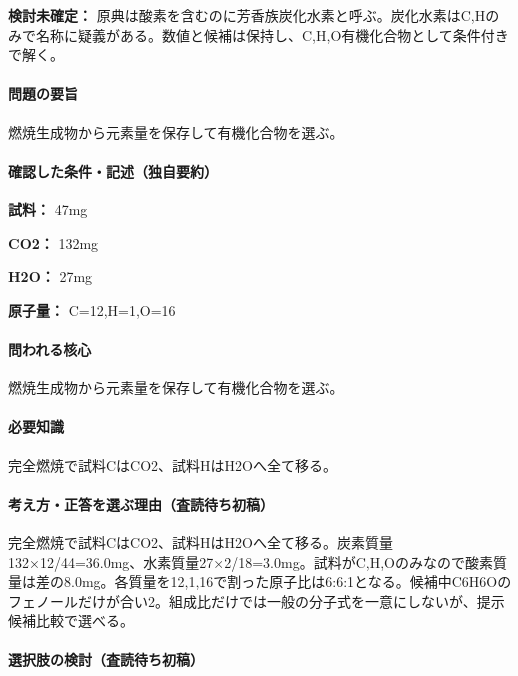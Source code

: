 \par\textbf{検討未確定：} 原典は酸素を含むのに芳香族炭化水素と呼ぶ。炭化水素はC,Hのみで名称に疑義がある。数値と候補は保持し、C,H,O有機化合物として条件付きで解く。

\paragraph{問題の要旨} 燃焼生成物から元素量を保存して有機化合物を選ぶ。

\paragraph{確認した条件・記述（独自要約）}\mbox{}\par

\noindent\textbf{試料：} 47mg\par

\noindent\textbf{CO2：} 132mg\par

\noindent\textbf{H2O：} 27mg\par

\noindent\textbf{原子量：} C=\allowbreak{}12,H=\allowbreak{}1,O=\allowbreak{}16\par

\paragraph{問われる核心} 燃焼生成物から元素量を保存して有機化合物を選ぶ。

\paragraph{必要知識} 完全燃焼で試料CはCO2、試料HはH2Oへ全て移る。

\paragraph{考え方・正答を選ぶ理由（査読待ち初稿）} 完全燃焼で試料CはCO2、試料HはH2Oへ全て移る。炭素質量132×12/44=\allowbreak{}36.0mg、水素質量27×2/18=\allowbreak{}3.0mg。試料がC,H,Oのみなので酸素質量は差の8.0mg。各質量を12,1,16で割った原子比は6:6:1となる。候補中C6H6Oのフェノールだけが合い2。組成比だけでは一般の分子式を一意にしないが、提示候補比較で選べる。

\paragraph{選択肢の検討（査読待ち初稿）}\mbox{}\par

